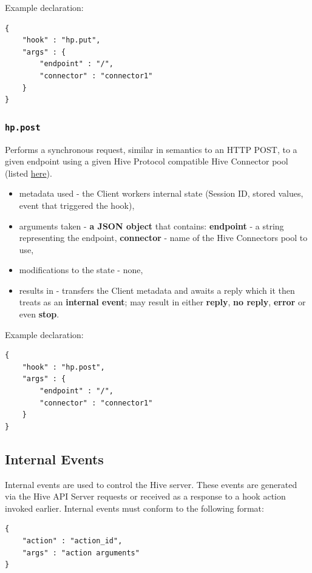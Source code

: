 \documentclass[a4paper]{article}
\begin{document}
\noindent
Example declaration:

\begin{verbatim}
{
    "hook" : "hp.put",
    "args" : {
        "endpoint" : "/",
        "connector" : "connector1"
    }
}
\end{verbatim}
\subsubsection{\texttt{hp.post}}
\label{sec-9-2-10}

Performs a synchronous request, similar in semantics to an HTTP POST, to a given endpoint using a given Hive Protocol compatible Hive Connector pool (listed \hyperref[ref-cp_connector]{here}).


\begin{itemize}
\item metadata used - the Client workers internal state (Session ID, stored values, event that triggered the hook),
\item arguments taken - \textbf{a JSON object} that contains: \textbf{endpoint} - a string representing the endpoint, \textbf{connector} - name of the Hive Connectors pool to use,
\item modifications to the state - none,
\item results in -  transfers the Client metadata and awaits a reply which it then treats as an \textbf{internal event}; may result in either \textbf{reply}, \textbf{no reply}, \textbf{error} or even \textbf{stop}.
\end{itemize}

\noindent
Example declaration:

\begin{verbatim}
{
    "hook" : "hp.post",
    "args" : {
        "endpoint" : "/",
        "connector" : "connector1"
    }
}
\end{verbatim}
\subsection{Internal Events}
\label{sec-9-3}
\label{ref-internal_events}
\label{ref-hive_events}


Internal events are used to control the Hive server. These events are generated via the Hive API Server requests or received as a response to a hook action invoked earlier. Internal events must conform to the following format:


\begin{verbatim}
{
    "action" : "action_id",
    "args" : "action arguments"
}
\end{verbatim}
\end{document}
